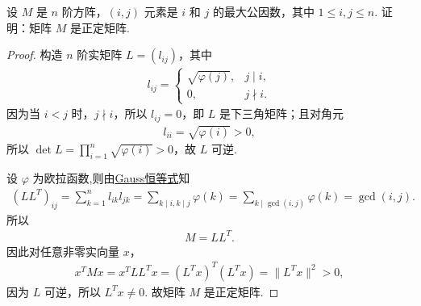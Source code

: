 \documentclass[../../main.tex]{subfiles}%
\begin{document}
\begin{example}
设 $M$ 是 $n$ 阶方阵，$(i,j)$ 元素是 $i$ 和 $j$ 的最大公因数，其中 $1 \leqslant i,j \leqslant n$. 证明：矩阵 $M$ 是正定矩阵.
\end{example}
\begin{proof}
构造 $n$ 阶实矩阵 $L=(l_{ij})$，其中
\begin{align*}
l_{ij}=
\begin{cases}
\sqrt{\varphi(j)}, & j\mid i,\\
0, & j\nmid i.
\end{cases}
\end{align*}
因为当 $i<j$ 时，$j\nmid i$，所以 $l_{ij}=0$，即 $L$ 是下三角矩阵；且对角元
\begin{align*}
l_{ii}=\sqrt{\varphi(i)}>0,
\end{align*}
所以 $\det L=\prod\limits_{i=1}^n \sqrt{\varphi(i)}>0$，故 $L$ 可逆.

设 $\varphi$ 为欧拉函数,则由\hyperref[Number Theory-theorem:欧拉函数的基本性质-4]{Gauss恒等式}知
\begin{align*}
(LL^T)_{ij}
=\sum_{k=1}^n l_{ik}l_{jk} 
=\sum_{k\mid i,k\mid j}\varphi(k) 
=\sum_{k\mid \gcd(i,j)}\varphi(k) =\gcd(i,j).
\end{align*}
所以
\begin{align*}
M=LL^T.
\end{align*}
因此对任意非零实向量 $x$，
\begin{align*}
x^TMx=x^TLL^Tx=(L^Tx)^T(L^Tx)=\|L^Tx\|^2>0,
\end{align*}
因为 $L$ 可逆，所以 $L^Tx\neq 0$.
故矩阵 $M$ 是正定矩阵.
\end{proof}
\end{document}
